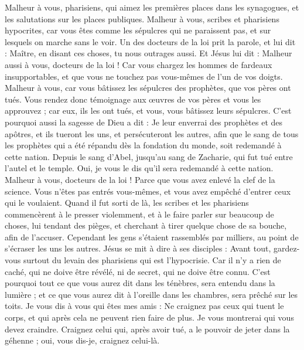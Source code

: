 \begin{multicols}{2}
Malheur à vous, pharisiens, qui aimez les premières places dans les synagogues, et les salutations sur les places publiques.
Malheur à vous, scribes et pharisiens hypocrites, car vous êtes comme les sépulcres qui ne paraissent pas, et sur lesquels on marche sans le voir.
Un des docteurs de la loi prit la parole, et lui dit : Maître, en disant ces choses, tu nous outrages aussi.
Et Jésus lui dit : Malheur aussi à vous, docteurs de la loi ! Car vous chargez les hommes de fardeaux insupportables, et que vous ne touchez pas vous-mêmes de l’un de vos doigts.
Malheur à vous, car vous bâtissez les sépulcres des prophètes, que vos pères ont tués.
Vous rendez donc témoignage aux œuvres de vos pères et vous les approuvez ; car eux, ils les ont tués, et vous, vous bâtissez leurs sépulcres.
C'est pourquoi aussi la sagesse de Dieu a dit : Je leur enverrai des prophètes et des apôtres, et ils tueront les uns, et persécuteront les autres,
afin que le sang de tous les prophètes qui a été répandu dès la fondation du monde, soit redemandé à cette nation.
Depuis le sang d'Abel, jusqu'au sang de Zacharie, qui fut tué entre l'autel et le temple. Oui, je vous le dis qu'il sera redemandé à cette nation.
Malheur à vous, docteurs de la loi ! Parce que vous avez enlevé la clef de la science. Vous n'êtes pas entrés vous-mêmes, et vous avez empêché d’entrer ceux qui le voulaient.
Quand il fut sorti de là, les scribes et les pharisiens commencèrent à le presser violemment, et à le faire parler sur beaucoup de choses,
lui tendant des pièges, et cherchant à tirer quelque chose de sa bouche, afin de l’accuser.
\VerseOne{}Cependant les gens s'étaient rassemblés par milliers, au point de s’écraser les uns les autres. Jésus se mit à dire à ses disciples : Avant tout, gardez-vous surtout du levain des pharisiens qui est l'hypocrisie.
Car il n'y a rien de caché, qui ne doive être révélé, ni de secret, qui ne doive être connu.
C'est pourquoi tout ce que vous aurez dit dans les ténèbres, sera entendu dans la lumière ; et ce que vous aurez dit à l'oreille dans les chambres, sera prêché sur les toits.
Je vous dis à vous qui êtes mes amis : Ne craignez pas ceux qui tuent le corps, et qui après cela ne peuvent rien faire de plus.
Je vous montrerai qui vous devez craindre. Craignez celui qui, après avoir tué, a le pouvoir de jeter dans la géhenne ; oui, vous dis-je, craignez celui-là.

\end{multicols}
